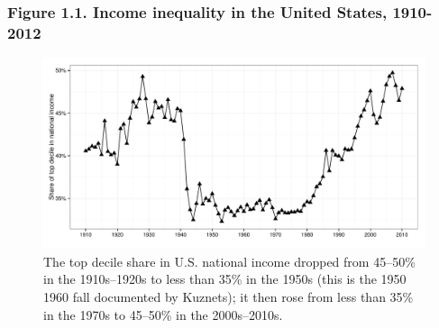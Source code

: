 \documentclass[t]{beamer}\usepackage[]{graphicx}\usepackage[]{color}
\newenvironment{knitrout}{}{} %
\begin{document}
\begin{frame}[label=Figure_1_1,fragile]
\frametitle{Figure 1.1. Income inequality in the United States, 1910-2012}
\begin{figure}[t]
\begin{minipage}[b]{\textwidth}
\centering
\begin{knitrout}\footnotesize
{}\color{fgcolor}

{\centering \includegraphics[width=1\linewidth]{figures/bw/Figure_1_1} 

}



\end{knitrout}
\caption{The top decile share in U.S. national income dropped from 45--50\% in the 1910s--1920s to less than 35\% in the 1950s (this is the
1950 1960 fall documented by Kuznets); it then rose from less than 35\% in the 1970s to 45--50\% in the 2000s--2010s.}
\end{minipage}
\end{figure}
\end{frame}
\end{document}
